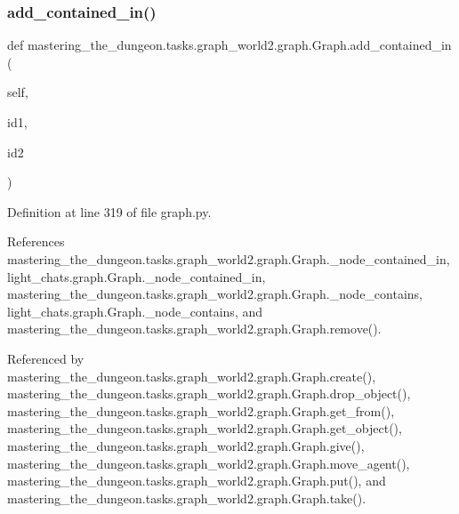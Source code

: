 \subsubsection{\texorpdfstring{add\+\_\+contained\+\_\+in()}{add\_contained\_in()}}
{\footnotesize\ttfamily def mastering\+\_\+the\+\_\+dungeon.\+tasks.\+graph\+\_\+world2.\+graph.\+Graph.\+add\+\_\+contained\+\_\+in (\begin{DoxyParamCaption}\item[{}]{self,  }\item[{}]{id1,  }\item[{}]{id2 }\end{DoxyParamCaption})}



Definition at line 319 of file graph.\+py.



References mastering\+\_\+the\+\_\+dungeon.\+tasks.\+graph\+\_\+world2.\+graph.\+Graph.\+\_\+node\+\_\+contained\+\_\+in, light\+\_\+chats.\+graph.\+Graph.\+\_\+node\+\_\+contained\+\_\+in, mastering\+\_\+the\+\_\+dungeon.\+tasks.\+graph\+\_\+world2.\+graph.\+Graph.\+\_\+node\+\_\+contains, light\+\_\+chats.\+graph.\+Graph.\+\_\+node\+\_\+contains, and mastering\+\_\+the\+\_\+dungeon.\+tasks.\+graph\+\_\+world2.\+graph.\+Graph.\+remove().



Referenced by mastering\+\_\+the\+\_\+dungeon.\+tasks.\+graph\+\_\+world2.\+graph.\+Graph.\+create(), mastering\+\_\+the\+\_\+dungeon.\+tasks.\+graph\+\_\+world2.\+graph.\+Graph.\+drop\+\_\+object(), mastering\+\_\+the\+\_\+dungeon.\+tasks.\+graph\+\_\+world2.\+graph.\+Graph.\+get\+\_\+from(), mastering\+\_\+the\+\_\+dungeon.\+tasks.\+graph\+\_\+world2.\+graph.\+Graph.\+get\+\_\+object(), mastering\+\_\+the\+\_\+dungeon.\+tasks.\+graph\+\_\+world2.\+graph.\+Graph.\+give(), mastering\+\_\+the\+\_\+dungeon.\+tasks.\+graph\+\_\+world2.\+graph.\+Graph.\+move\+\_\+agent(), mastering\+\_\+the\+\_\+dungeon.\+tasks.\+graph\+\_\+world2.\+graph.\+Graph.\+put(), and mastering\+\_\+the\+\_\+dungeon.\+tasks.\+graph\+\_\+world2.\+graph.\+Graph.\+take().

